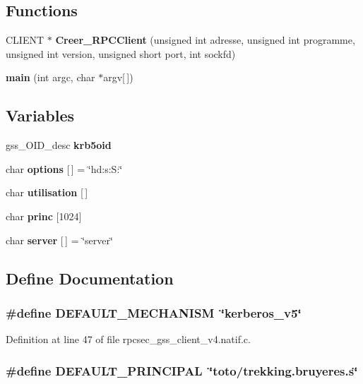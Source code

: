 \subsection*{Functions}
\begin{CompactItemize}
\item 
CLIENT $\ast$ {\bf Creer\_\-RPCClient} (unsigned int adresse, unsigned int programme, unsigned int version, unsigned short port, int sockfd)
\item 
{\bf main} (int argc, char $\ast$argv[$\,$])
\end{CompactItemize}
\subsection*{Variables}
\begin{CompactItemize}
\item 
gss\_\-OID\_\-desc {\bf krb5oid}
\item 
char {\bf options} [$\,$] = \char`\"{}hd:s:S:\char`\"{}
\item 
char {\bf utilisation} [$\,$]
\item 
char {\bf princ} [1024]
\item 
char {\bf server} [$\,$] = \char`\"{}server\char`\"{}
\end{CompactItemize}


\subsection{Define Documentation}
\subsubsection{\setlength{\rightskip}{0pt plus 5cm}\#define DEFAULT\_\-MECHANISM\ \char`\"{}kerberos\_\-v5\char`\"{}}\label{rpcsec__gss__client__v4_8natif_8c_a8}




Definition at line 47 of file rpcsec\_\-gss\_\-client\_\-v4.natif.c.
\subsubsection{\setlength{\rightskip}{0pt plus 5cm}\#define DEFAULT\_\-PRINCIPAL\ \char`\"{}toto/trekking.bruyeres.s\char`\"{}}\label{rpcsec__gss__client__v4_8natif_8c_a9}




